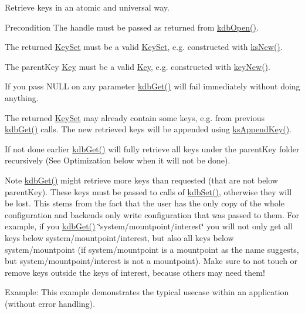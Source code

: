 Retrieve keys in an atomic and universal way. \begin{DoxyPrecond}{Precondition}
The {\ttfamily handle} must be passed as returned from \mbox{\hyperlink{group__kdb_ga6808defe5870f328dd17910aacbdc6ca}{kdb\+Open()}}.

The {\ttfamily returned} \mbox{\hyperlink{classkdb_1_1KeySet}{Key\+Set}} must be a valid \mbox{\hyperlink{classkdb_1_1KeySet}{Key\+Set}}, e.\+g. constructed with \mbox{\hyperlink{group__keyset_ga671e1aaee3ae9dc13b4834a4ddbd2c3c}{ks\+New()}}.

The {\ttfamily parent\+Key} \mbox{\hyperlink{classkdb_1_1Key}{Key}} must be a valid \mbox{\hyperlink{classkdb_1_1Key}{Key}}, e.\+g. constructed with \mbox{\hyperlink{group__key_gad23c65b44bf48d773759e1f9a4d43b89}{key\+New()}}.
\end{DoxyPrecond}
If you pass N\+U\+LL on any parameter \mbox{\hyperlink{group__kdb_ga28e385fd9cb7ccfe0b2f1ed2f62453a1}{kdb\+Get()}} will fail immediately without doing anything.

The {\ttfamily returned} \mbox{\hyperlink{classkdb_1_1KeySet}{Key\+Set}} may already contain some keys, e.\+g. from previous \mbox{\hyperlink{group__kdb_ga28e385fd9cb7ccfe0b2f1ed2f62453a1}{kdb\+Get()}} calls. The new retrieved keys will be appended using \mbox{\hyperlink{group__keyset_gaa5a1d467a4d71041edce68ea7748ce45}{ks\+Append\+Key()}}.

If not done earlier \mbox{\hyperlink{group__kdb_ga28e385fd9cb7ccfe0b2f1ed2f62453a1}{kdb\+Get()}} will fully retrieve all keys under the {\ttfamily parent\+Key} folder recursively (See Optimization below when it will not be done).

\begin{DoxyNote}{Note}
\mbox{\hyperlink{group__kdb_ga28e385fd9cb7ccfe0b2f1ed2f62453a1}{kdb\+Get()}} might retrieve more keys than requested (that are not below parent\+Key). These keys must be passed to calls of \mbox{\hyperlink{group__kdb_ga11436b058408f83d303ca5e996832bcf}{kdb\+Set()}}, otherwise they will be lost. This stems from the fact that the user has the only copy of the whole configuration and backends only write configuration that was passed to them. For example, if you \mbox{\hyperlink{group__kdb_ga28e385fd9cb7ccfe0b2f1ed2f62453a1}{kdb\+Get()}} \char`\"{}system/mountpoint/interest\char`\"{} you will not only get all keys below system/mountpoint/interest, but also all keys below system/mountpoint (if system/mountpoint is a mountpoint as the name suggests, but system/mountpoint/interest is not a mountpoint). Make sure to not touch or remove keys outside the keys of interest, because others may need them!
\end{DoxyNote}
\begin{DoxyParagraph}{Example\+:}
This example demonstrates the typical usecase within an application (without error handling).
\end{DoxyParagraph}

